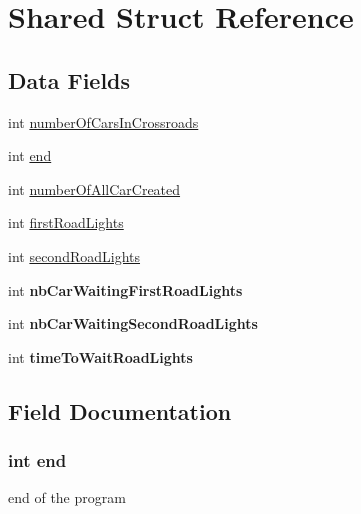 \hypertarget{struct_shared}{}\section{Shared Struct Reference}
\label{struct_shared}
\subsection*{Data Fields}
\begin{DoxyCompactItemize}
\item 
int \hyperlink{struct_shared_a240252544115d3c3b18c3c2f80c97ca6}{number\+Of\+Cars\+In\+Crossroads}
\item 
int \hyperlink{struct_shared_abce9f5dc9c83f2639b72024fdee5d388}{end}
\item 
int \hyperlink{struct_shared_a9390840c04ba9ffd6f2c936ed5de1ff6}{number\+Of\+All\+Car\+Created}
\item 
int \hyperlink{struct_shared_ad4ad4398734cc6353a690ea60255bd86}{first\+Road\+Lights}
\item 
int \hyperlink{struct_shared_af4c6d5f741ae4593a34b0cd8dce9321f}{second\+Road\+Lights}
\item 
\hypertarget{struct_shared_a870300e75d9811d54923267b39392986}{}int {\bfseries nb\+Car\+Waiting\+First\+Road\+Lights}\label{struct_shared_a870300e75d9811d54923267b39392986}

\item 
\hypertarget{struct_shared_a6afdc23277fee575482969cdb34dbcc8}{}int {\bfseries nb\+Car\+Waiting\+Second\+Road\+Lights}\label{struct_shared_a6afdc23277fee575482969cdb34dbcc8}

\item 
\hypertarget{struct_shared_ae121b2006e53c936a083f81b6d3e2d90}{}int {\bfseries time\+To\+Wait\+Road\+Lights}\label{struct_shared_ae121b2006e53c936a083f81b6d3e2d90}

\end{DoxyCompactItemize}


\subsection{Field Documentation}
\hypertarget{struct_shared_abce9f5dc9c83f2639b72024fdee5d388}{}
\subsubsection[{end}]{\setlength{\rightskip}{0pt plus 5cm}int end}\label{struct_shared_abce9f5dc9c83f2639b72024fdee5d388}
end of the program \hypertarget{struct_shared_ad4ad4398734cc6353a690ea60255bd86}{}
